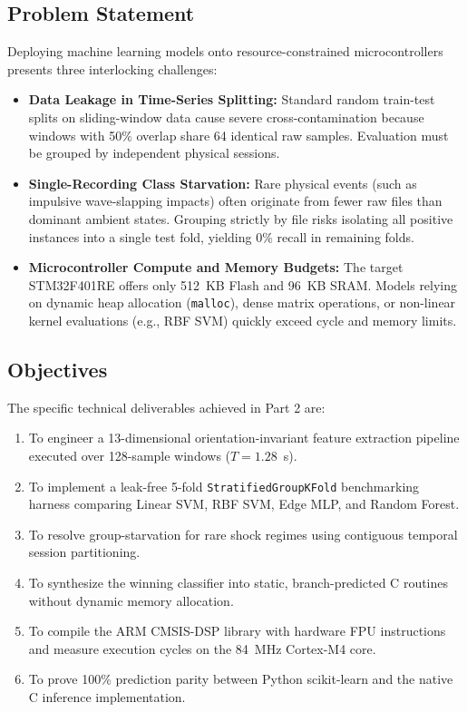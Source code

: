 \documentclass[twocolumn]{article}
\begin{document}
\subsection{Problem Statement}
Deploying machine learning models onto resource-constrained microcontrollers presents three interlocking challenges:
\begin{itemize}[noitemsep]
    \item \textbf{Data Leakage in Time-Series Splitting:} Standard random train-test splits on sliding-window data cause severe cross-contamination because windows with 50\% overlap share 64 identical raw samples. Evaluation must be grouped by independent physical sessions.
    \item \textbf{Single-Recording Class Starvation:} Rare physical events (such as impulsive wave-slapping impacts) often originate from fewer raw files than dominant ambient states. Grouping strictly by file risks isolating all positive instances into a single test fold, yielding 0\% recall in remaining folds.
    \item \textbf{Microcontroller Compute and Memory Budgets:} The target STM32F401RE offers only 512~KB Flash and 96~KB SRAM. Models relying on dynamic heap allocation (\texttt{malloc}), dense matrix operations, or non-linear kernel evaluations (e.g., RBF SVM) quickly exceed cycle and memory limits.
\end{itemize}

\subsection{Objectives}
The specific technical deliverables achieved in Part 2 are:
\begin{enumerate}[noitemsep]
    \item To engineer a 13-dimensional orientation-invariant feature extraction pipeline executed over 128-sample windows ($T = 1.28$~s).
    \item To implement a leak-free 5-fold \texttt{StratifiedGroupKFold} benchmarking harness comparing Linear SVM, RBF SVM, Edge MLP, and Random Forest.
    \item To resolve group-starvation for rare shock regimes using contiguous temporal session partitioning.
    \item To synthesize the winning classifier into static, branch-predicted C routines without dynamic memory allocation.
    \item To compile the ARM CMSIS-DSP library with hardware FPU instructions and measure execution cycles on the 84~MHz Cortex-M4 core.
    \item To prove 100\% prediction parity between Python scikit-learn and the native C inference implementation.
\end{enumerate}
\end{document}
